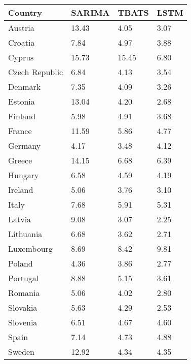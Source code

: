 \begin{tabular}{llll}
\toprule
Country & SARIMA & TBATS & LSTM \\
\midrule
Austria & 13.43 & 4.05 & 3.07 \\
Croatia & 7.84 & 4.97 & 3.88 \\
Cyprus & 15.73 & 15.45 & 6.80 \\
Czech Republic & 6.84 & 4.13 & 3.54 \\
Denmark & 7.35 & 4.09 & 3.26 \\
Estonia & 13.04 & 4.20 & 2.68 \\
Finland & 5.98 & 4.91 & 3.68 \\
France & 11.59 & 5.86 & 4.77 \\
Germany & 4.17 & 3.48 & 4.12 \\
Greece & 14.15 & 6.68 & 6.39 \\
Hungary & 6.58 & 4.59 & 4.19 \\
Ireland & 5.06 & 3.76 & 3.10 \\
Italy & 7.68 & 5.91 & 5.31 \\
Latvia & 9.08 & 3.07 & 2.25 \\
Lithuania & 6.68 & 3.62 & 2.71 \\
Luxembourg & 8.69 & 8.42 & 9.81 \\
Poland & 4.36 & 3.86 & 2.77 \\
Portugal & 8.88 & 5.15 & 3.61 \\
Romania & 5.06 & 4.02 & 2.80 \\
Slovakia & 5.63 & 4.29 & 2.53 \\
Slovenia & 6.51 & 4.67 & 4.60 \\
Spain & 7.14 & 4.73 & 4.88 \\
Sweden & 12.92 & 4.34 & 4.35 \\
\bottomrule
\end{tabular}
